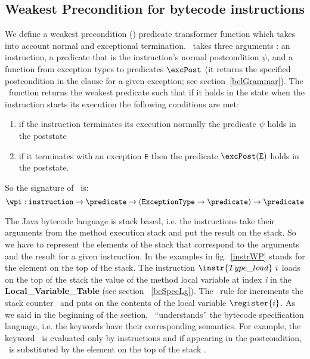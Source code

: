 \subsection{Weakest Precondition for bytecode instructions}\label{wpInstr}
We define a weakest precondition (\wpi) predicate transformer function which takes into account normal and exceptional termination. 
\wpi \ takes three arguments : an instruction, a predicate that is the instruction's normal postcondition $\psi$, and a function
from exception types to predicates $\excPost$ (it returns the specified postcondition in the  clause for a given exception; see section~\ref{bclGrammar}).
The \wpi \ function returns the weakest predicate such that if it holds in the state when the instruction starts its execution the following conditions are met: 
\begin{enumerate}
	\item if the instruction terminates its execution normally the predicate $\psi$ holds in the poststate 
	\item if it terminates with an exception \texttt{E} then the predicate $\excPost(\tt{E})$ holds in the poststate.
\end{enumerate}
 So the signature of \wpi \ is:
$$\wpi : \texttt{instruction} \rightarrow \predicate \rightarrow (\tt{ ExceptionType} \rightarrow  \predicate) \rightarrow \predicate   $$

 The Java bytecode language is stack based, i.e. the instructions take their arguments from the method execution stack and 
 put the result on the stack. So we have to represent the elements of the stack that correspond to the arguments and the result for a given instruction. 
 In the examples in fig.~\ref{instrWP} \stack{\counter} stands for the element on the top of the stack. 
 The instruction $\instr{Type\_load} \ i$  loads on the top of the stack the value of the method local variable at index \textit{i}
 in the \textbf{Local\_Variable\_Table} (see section ~\ref{bcSpecLg}). The \wpi \ rule for   increments the stack
counter \counter \ and puts on \stack{\counter} the contents of the local variable $\register{i}$.
As we said in the beginning of the section, \wpi \ ``understands'' the bytecode specification language, i.e. the keywords have their 
corresponding semantics. For example, the keyword \result \ is evaluated only by  
instructions and if appearing in the postcondition, \result \ is substituted by the element on the top of 
the stack \stack{\counter}. 

